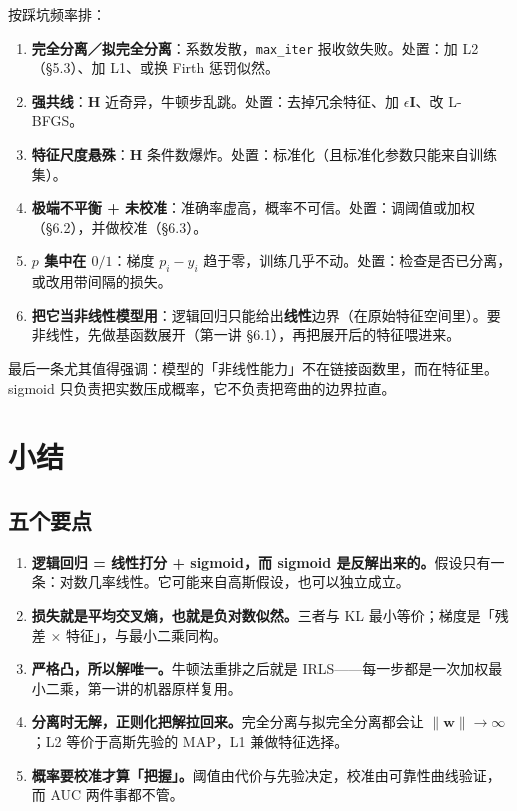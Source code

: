 \documentclass[11pt,a4paper,fontset=windows,zihao=-4]{ctexart}
\newcommand{\bw}{\mathbf{w}}
\newcommand{\bI}{\mathbf{I}}
\newcommand{\bH}{\mathbf{H}}
\newcommand{\norm}[1]{\lVert #1\rVert}
\begin{document}
按踩坑频率排：

\begin{enumerate}[label=\textcolor{navy}{\bfseries\arabic*.},leftmargin=2.0em,itemsep=0.45em]
  \item \textbf{完全分离／拟完全分离}：系数发散，\texttt{max\_iter} 报收敛失败。处置：加 L2（\S5.3）、加 L1、或换 Firth 惩罚似然。
  \item \textbf{强共线}：$\bH$ 近奇异，牛顿步乱跳。处置：去掉冗余特征、加 $\epsilon\bI$、改 L-BFGS。
  \item \textbf{特征尺度悬殊}：$\bH$ 条件数爆炸。处置：标准化（且标准化参数只能来自训练集）。
  \item \textbf{极端不平衡 + 未校准}：准确率虚高，概率不可信。处置：调阈值或加权（\S6.2），并做校准（\S6.3）。
  \item \textbf{$p$ 集中在 $0/1$}：梯度 $p_i-y_i$ 趋于零，训练几乎不动。处置：检查是否已分离，或改用带间隔的损失。
  \item \textbf{把它当非线性模型用}：逻辑回归只能给出\textbf{线性}边界（在原始特征空间里）。要非线性，先做基函数展开（第一讲 \S6.1），再把展开后的特征喂进来。
\end{enumerate}

最后一条尤其值得强调：模型的「非线性能力」不在链接函数里，而在特征里。sigmoid 只负责把实数压成概率，它不负责把弯曲的边界拉直。


\section{小结}

\subsection{五个要点}

\begin{enumerate}[label=\textcolor{navy}{\bfseries\arabic*.},leftmargin=2.3em,itemsep=0.55em]
  \item \textbf{逻辑回归 = 线性打分 + sigmoid，而 sigmoid 是反解出来的。}假设只有一条：对数几率线性。它可能来自高斯假设，也可以独立成立。
  \item \textbf{损失就是平均交叉熵，也就是负对数似然。}三者与 KL 最小等价；梯度是「残差 × 特征」，与最小二乘同构。
  \item \textbf{严格凸，所以解唯一。}牛顿法重排之后就是 IRLS——每一步都是一次加权最小二乘，第一讲的机器原样复用。
  \item \textbf{分离时无解，正则化把解拉回来。}完全分离与拟完全分离都会让 $\norm{\bw}\to\infty$；L2 等价于高斯先验的 MAP，L1 兼做特征选择。
  \item \textbf{概率要校准才算「把握」。}阈值由代价与先验决定，校准由可靠性曲线验证，而 AUC 两件事都不管。
\end{enumerate}
\end{document}
